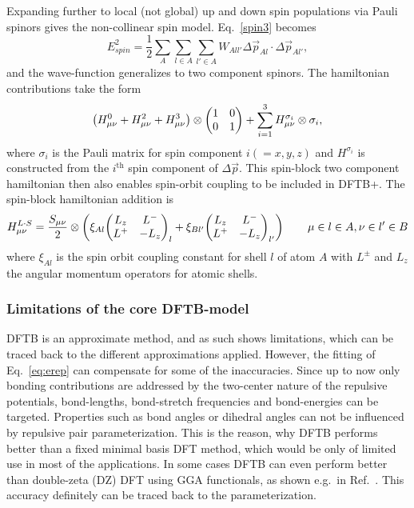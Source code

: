 \documentclass{revtex4-1}
\newcommand{\dftbp}{DFTB+}
\begin{document}
Expanding further to local (not global) up and down spin populations via Pauli
spinors gives the non-collinear spin model.\cite{doi:10.1021/jp068802p}
Eq.~\eqref{spin3} becomes
\begin{equation}
E^2_{spin} = \frac{1}{2}\sum_{A}\sum_{l \in A} \sum_{l' \in A} W_{All'} \Delta \vec{p}_{Al} \cdot \Delta \vec{p}_{Al'},\label{spin3nc}
\end{equation}
and the wave-function generalizes to two component spinors. The hamiltonian
contributions take the form
\begin{equation}
\left(H^0_{\mu\nu} + H^2_{\mu\nu} + H^3_{\mu\nu}\right) \otimes \mqty(\pmat{0}) + \sum_{i=1}^{3} H^{\sigma_i}_{\mu\nu} \otimes \sigma_i, 
\end{equation}
where $\sigma_i$ is the Pauli matrix for spin component $i (= x,y,z)$ and
$H^{\sigma_i}$ is constructed from the $i^\mathrm{th}$ spin component of $\Delta
\vec{p}$. This spin-block two component hamiltonian then also enables spin-orbit
coupling\cite{doi:10.1021/jp068802p,Hourahine11} to be included in \dftbp{}. The
spin-block hamiltonian addition is
\begin{equation}
H_{\mu\nu}^{L \cdot S} = \frac{S_{\mu\nu}}{2} \otimes\left(  \xi_{Al} \mqty( L_z & L^-\\ L^+ & - L_z )_l + \xi_{Bl'} \mqty( L_z & L^-\\ L^+ & - L_z )_{l'} \right)\qquad{\mu \in l\in A, \nu \in l' \in B}
\end{equation}
where $\xi_{Al}$ is the spin orbit coupling constant for shell $l$ of atom $A$
with $L^\pm$ and $L_z$ the angular momentum operators for atomic shells.

\subsubsection{Limitations of the core DFTB-model}

DFTB is an approximate method, and as such shows limitations, which can be
traced back to the different approximations applied.  However, the fitting of
Eq.~\eqref{eq:erep} can compensate for some of the inaccuracies.  Since up to
now only bonding contributions are addressed by the two-center nature of the
repulsive potentials, bond-lengths, bond-stretch frequencies and bond-energies
can be targeted. Properties such as bond angles or dihedral angles can not be
influenced by repulsive pair parameterization.  This is the reason, why DFTB
performs better than a fixed minimal basis DFT method, which would be only of
limited use in most of the applications. In some cases DFTB can even perform
better than double-zeta (DZ) DFT using GGA functionals, as shown e.g.\ in
Ref.~. This accuracy definitely can be traced back to the
parameterization.
\end{document}
